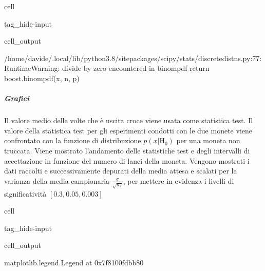 \documentclass[letterpaper,10pt,italian]{jupyterBook}
\begin{document}
\begin{sphinxuseclass}{cell}
\begin{sphinxuseclass}{tag_hide-input}\begin{sphinxVerbatimOutput}

\begin{sphinxuseclass}{cell_output}
\begin{sphinxVerbatim}[commandchars=\\\{\}]
/home/davide/.local/lib/python3.8/site\PYGZhy{}packages/scipy/stats/\PYGZus{}discrete\PYGZus{}distns.py:77: RuntimeWarning: divide by zero encountered in \PYGZus{}binom\PYGZus{}pdf
  return \PYGZus{}boost.\PYGZus{}binom\PYGZus{}pdf(x, n, p)
\end{sphinxVerbatim}

\end{sphinxuseclass}\end{sphinxVerbatimOutput}

\end{sphinxuseclass}
\end{sphinxuseclass}

\subparagraph{Grafici}
\label{\detokenize{ch/statistics/test-fisher-coin-2:grafici}}
\sphinxAtStartPar
Il valore medio delle volte che è uscita croce viene usata come statistica test. Il valore della statistica test per gli esperimenti condotti con le due monete viene confrontato con la funzione di distribuzione \(p(x|\text{H}_0)\) per una moneta non truccata. Viene mostrato l’andamento delle statistiche test e degli intervalli di accettazione in funzione del numero di lanci della moneta. Vengono mostrati i dati raccolti e successivamente depurati della media attesa e scalati per la varianza della media campionaria \(\frac{\sigma}{\sqrt{n_s}}\), per mettere in evidenza i livelli di significatività \([0.3, 0.05, 0.003]\)

\begin{sphinxuseclass}{cell}
\begin{sphinxuseclass}{tag_hide-input}\begin{sphinxVerbatimOutput}

\begin{sphinxuseclass}{cell_output}
\begin{sphinxVerbatim}[commandchars=\\\{\}]
\PYGZlt{}matplotlib.legend.Legend at 0x7f8100fdbb80\PYGZgt{}
\end{sphinxVerbatim}

\noindent{}

\end{sphinxuseclass}\end{sphinxVerbatimOutput}

\end{sphinxuseclass}
\end{sphinxuseclass}
\sphinxstepscope
\end{document}
